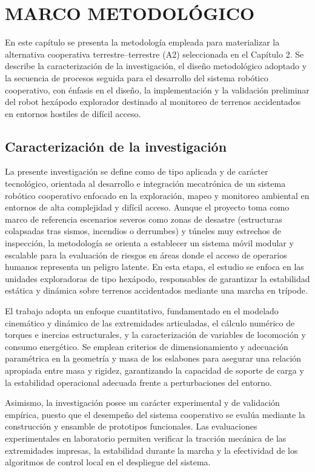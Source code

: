 \chapter{MARCO METODOLÓGICO}

En este capítulo se presenta la metodología empleada para materializar la alternativa cooperativa terrestre--terrestre (A2) seleccionada en el Capítulo 2. Se describe la caracterización de la investigación, el diseño metodológico adoptado y la secuencia de procesos seguida para el desarrollo del sistema robótico cooperativo, con énfasis en el diseño, la implementación y la validación preliminar del robot hexápodo explorador destinado al monitoreo de terrenos accidentados en entornos hostiles de difícil acceso.


\section{Caracterización de la investigación}

\noindent
La presente investigación se define como de tipo aplicada y de carácter tecnológico, orientada al desarrollo e integración mecatrónica de un sistema robótico cooperativo enfocado en la exploración, mapeo y monitoreo ambiental en entornos de alta complejidad y difícil acceso. Aunque el proyecto toma como marco de referencia escenarios severos como zonas de desastre (estructuras colapsadas tras sismos, incendios o derrumbes) y túneles muy estrechos de inspección, la metodología se orienta a establecer un sistema móvil modular y escalable para la evaluación de riesgos en áreas donde el acceso de operarios humanos representa un peligro latente. En esta etapa, el estudio se enfoca en las unidades exploradoras de tipo hexápodo, responsables de garantizar la estabilidad estática y dinámica sobre terrenos accidentados mediante una marcha en trípode.

\noindent
El trabajo adopta un enfoque cuantitativo, fundamentado en el modelado cinemático y dinámico de las extremidades articuladas, el cálculo numérico de torques e inercias estructurales, y la caracterización de variables de locomoción y consumo energético. Se emplean criterios de dimensionamiento y adecuación paramétrica en la geometría y masa de los eslabones para asegurar una relación apropiada entre masa y rigidez, garantizando la capacidad de soporte de carga y la estabilidad operacional adecuada frente a perturbaciones del entorno.

\noindent
Asimismo, la investigación posee un carácter experimental y de validación empírica, puesto que el desempeño del sistema cooperativo se evalúa mediante la construcción y ensamble de prototipos funcionales. Las evaluaciones experimentales en laboratorio permiten verificar la tracción mecánica de las extremidades impresas, la estabilidad durante la marcha y la efectividad de los algoritmos de control local en el despliegue del sistema.

